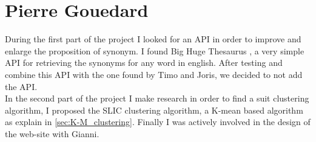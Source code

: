\section{Pierre Gouedard}

During the first part of the project I looked for an API in order to improve and enlarge the proposition of synonym. I found Big Huge Thesaurus \cite{BGT}, a very simple API for retrieving the synonyms for any word in english. After testing and combine this API with the one found by Timo and Joris, we decided to not add the API.\\
In the second part of the project I make research in order to find a suit clustering algorithm, I proposed the SLIC clustering algorithm,  a K-mean based algorithm as explain in \ref{sec:K-M_clustering}. Finally I was actively involved in the design of the web-site with Gianni.  


